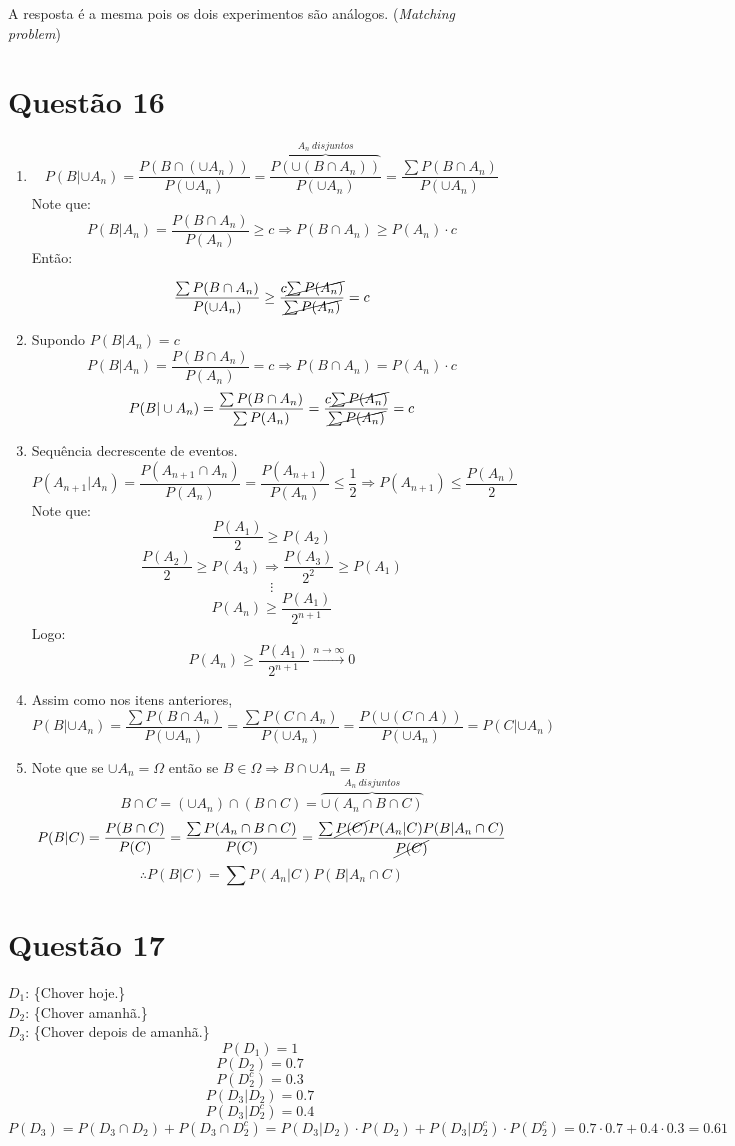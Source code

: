 \documentclass[a4paper,12pt]{report}
\begin{document}
A resposta é a mesma pois os dois experimentos são análogos. (\textit{Matching problem})

\section{Questão 16}

\begin{enumerate}[label=\alph*)]
	\item 
	$$P(B|\cup A_n)=\frac{P(B\cap (\cup A_n))}{P(\cup A_n)} 
=
\frac{\overbrace{P(\cup(B\cap A_n))}^{A_n \ disjuntos}}{P(\cup A_n)}
	=
	\frac{\sum P(B\cap A_n)}{P(\cup A_n)}
	$$
	Note que:
	$$P(B|A_n)=\frac{P(B\cap A_n)}{P(A_n)}\ge c \Rightarrow P(B\cap A_n)\ge P(A_n)\cdot c $$
	Então:
	
	$$\frac{\sum P(B\cap A_n)}{P(\cup A_n)} \ge 	\frac{c\cancel{\sum P(A_n)}}{\cancel{\sum P(A_n)}}=c$$
	\item Supondo $P(B|A_n)=c $ 
		$$P(B|A_n)=\frac{P(B\cap A_n)}{P(A_n)}= c \Rightarrow P(B\cap A_n)= P(A_n)\cdot c $$
		$$P(B|\cup A_n)=
			\frac{\sum P(B\cap A_n)}{\sum P(A_n)}
		=
				\frac{c\cancel{\sum P(A_n)}}{\cancel{\sum P(A_n)}}=c
		$$
		\item 
Sequência decrescente de eventos.	
		$$P(A_{n+1}|A_n)=\frac{P(A_{n+1}\cap A_n)}{P(A_n)}=\frac{P(A_{n+1})}{P(A_n)}\le \frac{1}{2} \Rightarrow P(A_{n+1}) \le \frac{P(A_n)}{2}$$
Note que:
$$\frac{P(A_1)}{2}\ge P(A_2)$$
$$\frac{P(A_2)}{2}\ge P(A_3)\Rightarrow \frac{P(A_3)}{2^2}\ge P(A_1) $$
$$\vdots$$
$$P(A_n)\ge \frac{P(A_1)}{2^{n+1}} $$
Logo:
$$P(A_n)\ge \frac{P(A_1)}{2^{n+1}} \overset{n\rightarrow \infty}{\longrightarrow} 0$$
\item 
Assim como nos itens anteriores,
$$P(B|\cup A_n) =\frac{\sum P(B\cap A_n)}{P(\cup A_n)} =  \frac{\sum P(C\cap A_n)}{P(\cup A_n)}
=
\frac{P(\cup (C\cap A))}{P(\cup A_n)} = P(C|\cup A_n)
$$
\newpage
\item 
Note que se $\cup A_n = \Omega$ então se  $B\in \Omega \Rightarrow B\cap \cup A_n = B$  
$$B\cap C = (\cup A_n)\cap(B\cap C)=\overbrace{\cup (A_n\cap B\cap C)}^{A_n \ disjuntos}  $$
$$P(B|C) = \frac{P(B\cap C)}{P(C)}  = \frac{\sum P(A_n\cap B\cap C)}{P(C)} = \frac{\sum \cancel{P(C)}P(A_n|C) P(B|A_n\cap C)}{\cancel{P(C)}} $$
$$\therefore P(B|C) =  \sum P(A_n|C) P(B|A_n\cap C) $$
\end{enumerate}


\section{Questão 17}
$D_1$: \{Chover  hoje.\}\\
$D_2$: \{Chover  amanhã.\}\\
$D_3$: \{Chover  depois de amanhã.\}\\
$$P(D_1)= 1 $$
$$P(D_2)= 0.7 $$
$$P(D_2^c)= 0.3$$
$$P(D_3|D_2)=0.7$$
$$P(D_3|D_2^c)=0.4$$
$$P(D_3) = P(D_3\cap D_2)+P(D_3\cap D_2^c)= P(D_3|D_2)\cdot P(D_2) + P(D_3|D_2^c)\cdot P(D_2^c)=
0.7\cdot 0.7 + 0.4\cdot 0.3 = 0.61$$
\end{document}
